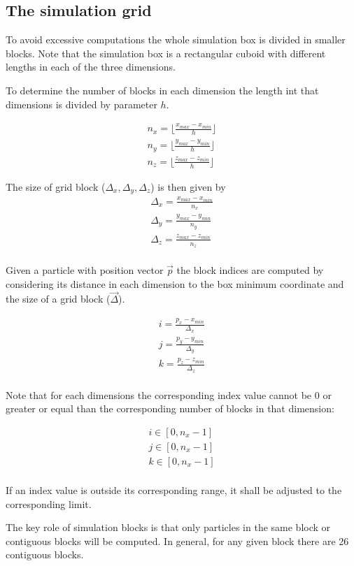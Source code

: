 \subsection{The simulation grid}

To avoid excessive computations the whole simulation box is divided in smaller
blocks. Note that the simulation box is a rectangular cuboid with different
lengths in each of the three dimensions. 

To determine the number of blocks in each dimension the length int that
dimensions is divided by parameter $h$.

\[
\begin{split}
n_x = \lfloor \frac{x_{max}- x_{min}}{h} \rfloor\\
n_y = \lfloor \frac{y_{max}- y_{min}}{h} \rfloor\\
n_z = \lfloor \frac{z_{max}- z_{min}}{h} \rfloor
\end{split}
\]

The size of grid block ($\Delta_x, \Delta_y, \Delta_z$) is then given by
\[
\begin{split}
\Delta_x = \frac{x_{max} - x_{min}}{n_x}\\
\Delta_y = \frac{y_{max} - y_{min}}{n_y}\\
\Delta_z = \frac{z_{max} - z_{min}}{n_z}\\
\end{split}
\] 

Given a particle with position vector $\vec{p}$ the block indices are computed
by considering its distance in each dimension to the box minimum coordinate
and the size of a grid block ($\vec{\Delta}$).

\[
\begin{split}
i = \frac{p_x - x_{min}}{\Delta_x}\\
j = \frac{p_y - y_{min}}{\Delta_y}\\
k = \frac{p_z - z_{min}}{\Delta_z}\\
\end{split}
\]

Note that for each dimensions the corresponding index value cannot be $0$ or
greater or equal than the corresponding number of blocks in that dimension:

\[
\begin{split}
i \in [0, n_x-1]\\
j \in [0, n_x-1]\\
k \in [0, n_x-1]\\
\end{split}
\]

If an index value is outside its corresponding range, it shall be adjusted to
the corresponding limit.

The key role of simulation blocks is that only particles in the same block or
contiguous blocks will be computed. In general, for any given block there are
26 contiguous blocks.
